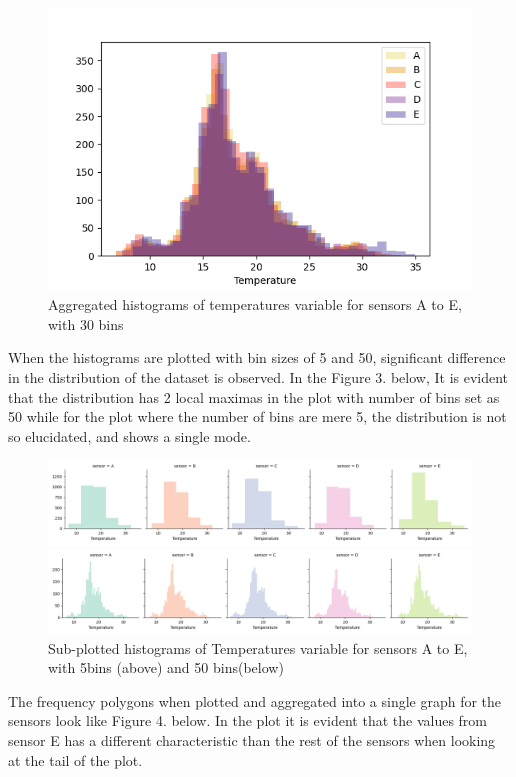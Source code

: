 \documentclass[a4paper]{article}
\begin{document}
\begin{figure}[H]
\includegraphics[width=12cm]{images/a1_2.png}
\centering
\caption{Aggregated histograms of temperatures variable for sensors A to E, with 30 bins}
\end{figure}

 When the histograms are plotted with bin sizes of 5 and 50, significant difference in the distribution of the dataset is observed. In the Figure 3. below, It is evident that the distribution has 2 local maximas in the plot with number of bins set as 50 while for the plot where the number of bins are mere 5, the distribution is not so elucidated, and shows a single mode.

\begin{figure}[H]
\includegraphics[width=17cm]{images/a1_3.png}
\centering

\includegraphics[width=17cm]{images/a1_4.png}
\centering
\caption{Sub-plotted histograms of Temperatures variable for sensors A to E, with 5bins (above) and 50 bins(below)}
\end{figure}

The frequency polygons when plotted and aggregated into a single graph for the sensors look like Figure 4. below. In the plot it is evident that the values from sensor E has a different characteristic than the rest of the sensors when looking at the tail of the plot.
\end{document}
